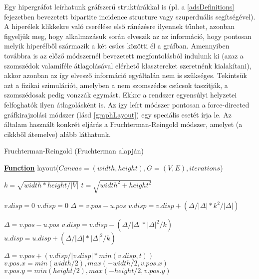 Egy hipergráfot leírhatunk gráfszerű struktúrákkal is (pl. a \ref{adsDefinitions} fejezetben bevezetett bipartite incidence structure vagy szuperduális segítségével). A hiperélek klikkekre való cserélése első ránézésre ilyennek tűnhet, azonban figyeljük meg, hogy alkalmazásuk során elveszik az az információ, hogy pontosan melyik hiperélből származik a két csúcs közötti él a gráfban. Amennyiben továbbra is az előző módszernél bevezetett megfontolásból indulunk ki (azaz a szomszédok valamiféle átlagolásával elérhető klasztereket szeretnénk kialakítani), akkor azonban az így elvesző információ egyáltalán nem is szükséges. Tekintsük azt a fizikai szimulációt, amelyben a nem szomszédos csúcsok taszítják, a szomszédosak pedig vonzzák egymást. Ekkor a rendszer egyensúlyi helyzetei felfoghatók ilyen átlagolásként is. Az így leírt módszer pontosan a force-directed gráfkirajzolási módszer (lásd \ref{graphLayout}) egy speciális esetét írja le. Az általam használt konkrét eljárás a Fruchterman-Reingold módszer\cite{graph_layout_fruchterman}, amelyet (a cikkből átemelve) alább láthatunk.


\begin{algorithm}[H]
\caption{Fruchterman-Reingold (Fruchterman alapján\cite{graph_layout_fruchterman})}
\label{alg:fruchterman} 
\textbf{\underline{Function}} layout($Canvas=(width, height), G=(V,E), iterations$)
\begin{algorithmic}[1]
\STATE $k = \sqrt{width*height/|V|}$
\STATE $t = \sqrt{width^2+height^2}$ 


	 
		\STATE $v.disp = 0$
				\STATE $v.disp = 0$
				\STATE $\Delta = v.pos - u.pos$
				\STATE $v.disp = v.disp + (\Delta/|\Delta|*k^2/|\Delta|)$
			\ENDIF
		\ENDFOR
	\ENDFOR
	
	
	 
		\STATE $\Delta = v.pos - u.pos$
		\STATE $v.disp = v.disp - (\Delta/|\Delta|*|\Delta|^2/k)$
		\STATE $u.disp = u.disp + (\Delta/|\Delta|*|\Delta|^2/k)$
	\ENDFOR
	
	
		\STATE $\Delta = v.pos + (v.disp/|v.disp|*min(v.disp,t))$ 
		\STATE $v.pos.x = min(width/2), max(-width/2, v.pos.x)$ 
		\STATE $v.pos.y = min(height/2), max(-height/2, v.pos.y)$
	\ENDFOR
{}
\end{algorithmic}
\end{algorithm}


